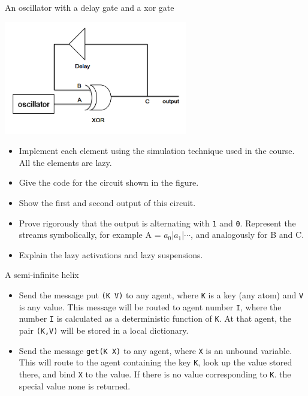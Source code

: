 
\def\date{Jan. 7, 2013}

\begin{Q1}{An oscillator with a delay gate and a xor gate}
  \begin{center}
    \includegraphics[width=0.6\textwidth]{circuit.png}
  \end{center}
 \begin{itemize}
   \item Implement each element using the simulation technique
     used in the course.
     All the elements are lazy.
   \item Give the code for the circuit shown in the figure.
   \item Show the first and second output of this circuit.
   \item Prove rigorously that the output is alternating with
     \lstinline|1| and \lstinline|0|.
     Represent the streams symbolically, for example
     A = $a_0$|$a_1$|$\cdots$,
     and analogously for B and C.
   \item Explain the lazy activations and lazy suspensions.
 \end{itemize}
\end{Q1}

\begin{Q2}{A semi-infinite helix}
  \begin{itemize}
    \item Send the message put \lstinline|(K V)| to any agent, where \lstinline|K| is a key (any atom) and \lstinline|V| is any value.
      This message will be routed to agent number \lstinline|I|, where the number \lstinline|I| is calculated as a
      deterministic function of \lstinline|K|. At that agent, the pair \lstinline|(K,V)| will be stored in a local dictionary.
    \item Send the message \lstinline|get(K X)| to any agent, where \lstinline|X| is an unbound variable. This will route
      to the agent containing the key \lstinline|K|, look up the value stored there, and bind \lstinline|X| to the value.
      If there is no value corresponding to \lstinline|K|. the special value none is returned.
  \end{itemize}
\end{Q2}


